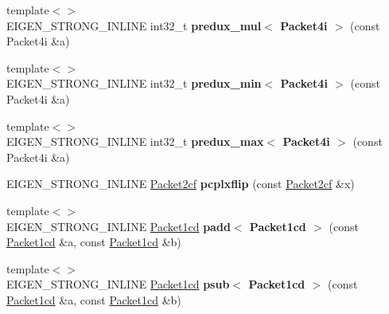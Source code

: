 \begin{DoxyCompactItemize}
{\footnotesize template$<$$>$ }\\E\+I\+G\+E\+N\+\_\+\+S\+T\+R\+O\+N\+G\+\_\+\+I\+N\+L\+I\+NE int32\+\_\+t {\bfseries predux\+\_\+mul$<$ Packet4i $>$} (const Packet4i \&a)
\item 
\mbox{\label{namespace_eigen_1_1internal_a7df688150694c95fd630cb8cc0f087bf}} 
{\footnotesize template$<$$>$ }\\E\+I\+G\+E\+N\+\_\+\+S\+T\+R\+O\+N\+G\+\_\+\+I\+N\+L\+I\+NE int32\+\_\+t {\bfseries predux\+\_\+min$<$ Packet4i $>$} (const Packet4i \&a)
\item 
\mbox{\label{namespace_eigen_1_1internal_a1f8fd93c864f643ab881d410ed918122}} 
{\footnotesize template$<$$>$ }\\E\+I\+G\+E\+N\+\_\+\+S\+T\+R\+O\+N\+G\+\_\+\+I\+N\+L\+I\+NE int32\+\_\+t {\bfseries predux\+\_\+max$<$ Packet4i $>$} (const Packet4i \&a)
\item 
\mbox{\label{namespace_eigen_1_1internal_a752eef39a3c68c505abf22cc53eb294c}} 
E\+I\+G\+E\+N\+\_\+\+S\+T\+R\+O\+N\+G\+\_\+\+I\+N\+L\+I\+NE \hyperlink{struct_eigen_1_1internal_1_1_packet2cf}{Packet2cf} {\bfseries pcplxflip} (const \hyperlink{struct_eigen_1_1internal_1_1_packet2cf}{Packet2cf} \&x)
\item 
\mbox{\label{namespace_eigen_1_1internal_a91fe74310c5fa5881be8da11965daf87}} 
{\footnotesize template$<$$>$ }\\E\+I\+G\+E\+N\+\_\+\+S\+T\+R\+O\+N\+G\+\_\+\+I\+N\+L\+I\+NE \hyperlink{struct_eigen_1_1internal_1_1_packet1cd}{Packet1cd} {\bfseries padd$<$ Packet1cd $>$} (const \hyperlink{struct_eigen_1_1internal_1_1_packet1cd}{Packet1cd} \&a, const \hyperlink{struct_eigen_1_1internal_1_1_packet1cd}{Packet1cd} \&b)
\item 
\mbox{\label{namespace_eigen_1_1internal_afdd05fcf97e3cb75dff26ba129af7c08}} 
{\footnotesize template$<$$>$ }\\E\+I\+G\+E\+N\+\_\+\+S\+T\+R\+O\+N\+G\+\_\+\+I\+N\+L\+I\+NE \hyperlink{struct_eigen_1_1internal_1_1_packet1cd}{Packet1cd} {\bfseries psub$<$ Packet1cd $>$} (const \hyperlink{struct_eigen_1_1internal_1_1_packet1cd}{Packet1cd} \&a, const \hyperlink{struct_eigen_1_1internal_1_1_packet1cd}{Packet1cd} \&b)

\end{DoxyCompactItemize}
